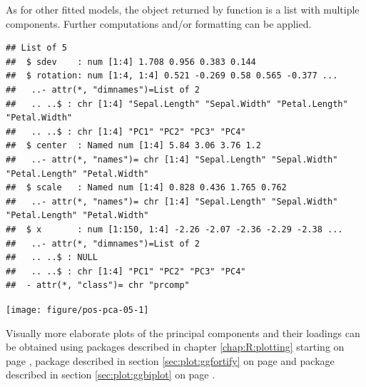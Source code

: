 \documentclass[krantz2]{krantz}\usepackage{knitr}%
\begin{document}
\begin{explainbox}
As for other fitted models, the object returned by function  is a list with multiple components. Further computations and/or formatting can be applied.

\begin{knitrout}\footnotesize
{}\color{fgcolor}\begin{kframe}
\begin{alltt}
\end{alltt}
\begin{verbatim}
## List of 5
##  $ sdev    : num [1:4] 1.708 0.956 0.383 0.144
##  $ rotation: num [1:4, 1:4] 0.521 -0.269 0.58 0.565 -0.377 ...
##   ..- attr(*, "dimnames")=List of 2
##   .. ..$ : chr [1:4] "Sepal.Length" "Sepal.Width" "Petal.Length" "Petal.Width"
##   .. ..$ : chr [1:4] "PC1" "PC2" "PC3" "PC4"
##  $ center  : Named num [1:4] 5.84 3.06 3.76 1.2
##   ..- attr(*, "names")= chr [1:4] "Sepal.Length" "Sepal.Width" "Petal.Length" "Petal.Width"
##  $ scale   : Named num [1:4] 0.828 0.436 1.765 0.762
##   ..- attr(*, "names")= chr [1:4] "Sepal.Length" "Sepal.Width" "Petal.Length" "Petal.Width"
##  $ x       : num [1:150, 1:4] -2.26 -2.07 -2.36 -2.29 -2.38 ...
##   ..- attr(*, "dimnames")=List of 2
##   .. ..$ : NULL
##   .. ..$ : chr [1:4] "PC1" "PC2" "PC3" "PC4"
##  - attr(*, "class")= chr "prcomp"
\end{verbatim}
\end{kframe}
\end{knitrout}

\end{explainbox}



\begin{knitrout}\footnotesize
{}\color{fgcolor}\begin{kframe}
\begin{alltt}
\end{alltt}
\end{kframe}

{\centering \texttt{[image: figure/pos-pca-05-1]} 

}



\end{knitrout}

Visually more elaborate plots of the principal components and their loadings can be obtained using packages  described in chapter \ref{chap:R:plotting} starting on page \pageref{chap:R:performance}, package  described in section \ref{sec:plot:ggfortify} on page \pageref{sec:plot:ggfortify} and package  described in section \ref{sec:plot:ggbiplot} on page \pageref{sec:plot:ggbiplot}.
\end{document}
